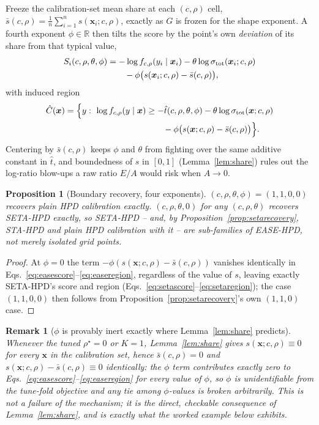 \documentclass[10pt,twocolumn,a4paper]{article}
\newtheorem{proposition}{Proposition}
\newtheorem{remark}{Remark}
\begin{document}
Freeze the calibration-set mean share at each $(c,\rho)$ cell, $\bar s(c,\rho) =
\tfrac1n\sum_{i=1}^n s(\bm x_i;c,\rho)$, exactly as $G$ is frozen for the shape exponent. A fourth
exponent $\phi\in\mathbb R$ then tilts the score by the point's own \emph{deviation} of its share from
that typical value,
\begin{align}
S_i(c,\rho,\theta,\phi) &= -\log f_{c,\rho}(y_i\mid\bm x_i) - \theta\log\sigma_{\mathrm{tot}}(\bm x_i;c,\rho) \notag\\
&\qquad{}- \phi\big(s(\bm x_i;c,\rho)-\bar s(c,\rho)\big), \label{eq:easescore}
\end{align}
with induced region
\begin{align}
\hat C(\bm x) = \Big\{y :\ \log f_{c,\rho}(y\mid\bm x) &\ge -\hat t(c,\rho,\theta,\phi) - \theta\log\sigma_{\mathrm{tot}}(\bm x;c,\rho) \notag\\
&\qquad{}- \phi\big(s(\bm x;c,\rho)-\bar s(c,\rho)\big)\Big\}. \label{eq:easeregion}
\end{align}
Centering by $\bar s(c,\rho)$ keeps $\phi$ and $\theta$ from fighting over the same additive constant
in $\hat t$, and boundedness of $s$ in $[0,1]$ (Lemma~\ref{lem:share}) rules out the log-ratio blow-ups
a raw ratio $E/A$ would risk when $A\to0$.

\begin{proposition}[Boundary recovery, four exponents]
\label{prop:easerecovery}
$(c,\rho,\theta,\phi)=(1,1,0,0)$ recovers plain HPD calibration exactly. $(c,\rho,\theta,0)$ for any
$(c,\rho,\theta)$ recovers SETA-HPD exactly, so SETA-HPD -- and, by
Proposition~\ref{prop:setarecovery}, STA-HPD and plain HPD calibration with it -- are sub-families
of EASE-HPD, not merely isolated grid points.
\end{proposition}
\begin{proof}
At $\phi=0$ the term $-\phi(s(\bm x;c,\rho)-\bar s(c,\rho))$ vanishes identically in
Eqs.~\eqref{eq:easescore}--\eqref{eq:easeregion}, regardless of the value of $s$, leaving exactly
SETA-HPD's score and region (Eqs.~\eqref{eq:setascore}--\eqref{eq:setaregion}); the case
$(1,1,0,0)$ then follows from Proposition~\ref{prop:setarecovery}'s own $(1,1,0)$ case.
\end{proof}

\begin{remark}[$\phi$ is provably inert exactly where Lemma~\ref{lem:share} predicts]
\label{rem:phiinert}
Whenever the tuned $\rho^\star=0$ or $K=1$, Lemma~\ref{lem:share} gives $s(\bm x;c,\rho)\equiv0$ for
every $\bm x$ in the calibration set, hence $\bar s(c,\rho)=0$ and $s(\bm x;c,\rho)-\bar s(c,\rho)\equiv0$
identically: the $\phi$ term contributes exactly zero to Eqs.~\eqref{eq:easescore}--\eqref{eq:easeregion}
for \emph{every} value of $\phi$, so $\phi$ is unidentifiable from the tune-fold objective and any tie
among $\phi$-values is broken arbitrarily. This is not a failure of the mechanism; it is the direct,
checkable consequence of Lemma~\ref{lem:share}, and is exactly what the worked example below
exhibits.
\end{remark}
\end{document}
